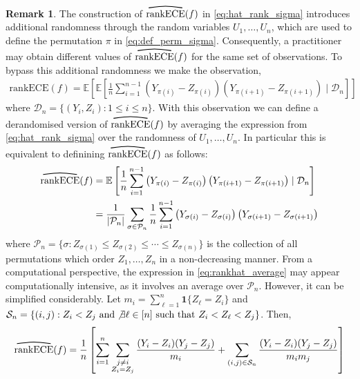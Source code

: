 \documentclass[11pt]{article}
\numberwithin{equation}{section}
\theoremstyle{definition}
\newtheorem{remark}{Remark}[section]
\newcommand{\E}{\mathbb{E}}
\newcommand{\cD}{\mathcal{D}}
\newcommand{\cP}{\mathcal{P}}
\newcommand{\cS}{\mathcal{S}}
\newcommand{\one}{\bm{1}}
\newcommand{\myoverline}[2][3.5em]{%
  \overset{%
    \tikz[baseline=-0.1ex]{
      \draw[line width=0.75pt]
        (0,0) .. controls (#1/2,0.5ex) .. (#1,0);
    }%
  }{#2}%
}
\newcommand{\rankECE}{\mathrm{rankECE}}
\newcommand{\hatrankECE}{\myoverline{\rankECE}}
\begin{document}
\begin{remark}\label{remark:rankece_derandom}
    The construction of $\hatrankECE(f)$ in \eqref{eq:hat_rank_sigma} introduces additional randomness through the random variables $U_1,\ldots,U_n$, which are used to define the permutation $\pi$ in \eqref{eq:def_perm_sigma}. Consequently, a practitioner may obtain different values of $\hatrankECE(f)$ for the same set of observations. To bypass this additional randomness we make the observation,
    \begin{align*}
        \rankECE(f) = \E\left[\E\left[
    \frac{1}{n}\sum_{i=1}^{n-1}
    \left(Y_{\pi(i)}-Z_{\pi(i)}\right)
    \left(Y_{\pi(i+1)}-Z_{\pi(i+1)}\right)
    \mid \cD_n\right]\right]
    \end{align*}
    where $\cD_n = \{(Y_i, Z_i): 1\leq i\leq n\}$. With this observation we can define a derandomised version of $\hatrankECE(f)$ by averaging the expression from \eqref{eq:hat_rank_sigma} over the randomness of $U_1,\ldots, U_n$. In particular this is equivalent to definining $\hatrankECE(f)$ as follows:
    \begin{align}\label{eq:rankhat_average}
        \hatrankECE(f) 
        & = \E\left[
    \frac{1}{n}\sum_{i=1}^{n-1}
    \left(Y_{\pi(i)}-Z_{\pi(i)}\right)
    \left(Y_{\pi(i+1)}-Z_{\pi(i+1)}\right)
    \mid \cD_n\right]\nonumber\\
        & = \frac{1}{\left|\cP_n\right|}\sum_{\sigma\in \cP_n}\frac{1}{n}\sum_{i=1}^{n-1}
    \left(Y_{\sigma(i)}-Z_{\sigma(i)}\right)
    \left(Y_{\sigma(i+1)}-Z_{\sigma(i+1)}\right)
    \end{align}
    where $\cP_n = \{\sigma: Z_{\sigma(1)}\leq Z_{\sigma(2)}\leq\cdots\leq Z_{\sigma(n)}\}$ is the collection of all permutations which order $Z_1,\ldots, Z_n$ in a non-decreasing manner. From a computational perspective, the expression in \eqref{eq:rankhat_average} may appear computationally intensive, as it involves an average over $\cP_n$. However, it can be simplified considerably. Let $m_i = \sum_{\ell=1}^{n}\one\{Z_\ell = Z_i\}$ and $\cS_n = \{(i,j): Z_i<Z_j\text{ and}\not\exists \ell\in [n]\text{ such that }Z_i<Z_\ell<Z_j\}$. Then,
    \begin{align}\label{eq:rankhat_simple}
        \hatrankECE(f) = \frac{1}{n}\left[\sum_{i=1}^{n}\sum_{\substack{j\neq i\\Z_i = Z_j}}\frac{(Y_i - Z_i)(Y_j-Z_j)}{m_i} + \sum_{(i,j)\in \cS_n}\frac{(Y_i-Z_i)(Y_j-Z_j)}{m_im_j} \right]
    \end{align}

\end{remark} 
\end{document}
